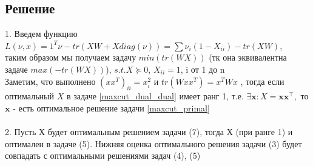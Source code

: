 \documentclass[a4paper,12pt]{article}
\begin{document}
\subsection*{Решение}

1. Введем функцию $L(\nu , x ) = 1^T\nu - tr(XW + Xdiag(\nu)) = \sum \nu_i(1-X_{ii}) -tr(XW) $, \\ таким образом мы получаем задачу $min( tr(WX))$ (тк она эквивалентна задаче $max (- tr(WX))$), $s.t. X \succeq 0$, $X_{ii}=1$, i от 1 до n \\
Заметим, что выполнено $(xx^T)_{ii} = x_i^2 $ и $tr(Wxx^T) = x^TWx$ , тогда если оптимальный $X$ в задаче \eqref{maxcut_dual_dual} имеет ранг 1, т.е. $\exists \mathbf{x}: X=\mathbf{x}\mathbf{x}^\top,$ то $\mathbf{x}$ - есть оптимальное решение задачи \eqref{maxcut_primal} \\
\\
2. Пусть Х будет оптимальным решением задачи (7), тогда Х (при ранге 1) и оптимален в задаче (5).  Нижняя оценка оптимального решения задачи (3) будет совпадать с оптимальными решениями задач (4), (5)
\end{document}
